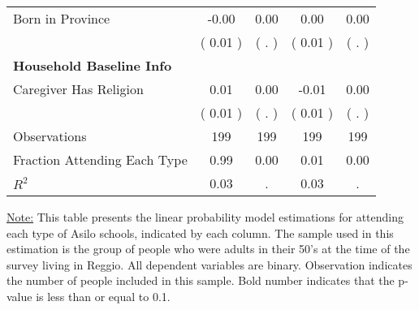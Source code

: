 \begin{table}[H]
{\begin{tabular}{lcccc}
\quad Born in Province &     -0.00 &      0.00 &      0.00 &      0.00 \\
\quad  & (     0.01 ) & (        . )  & (     0.01 )  & (        . )  \\
\midrule
\textbf{Household Baseline Info} \\
\quad Caregiver Has Religion &      0.01 &      0.00 &     -0.01 &      0.00 \\
\quad  & (     0.01 ) & (        . )  & (     0.01 )  & (        . )  \\
\midrule
Observations & 199 & 199 & 199 & 199 \\
Fraction Attending Each Type &      0.99 &      0.00 &      0.01 &      0.00 \\
\midrule
$ R^2$ &      0.03 &         . &      0.03 &         . \\
\bottomrule
\end{tabular}}
\end{table}
\begin{footnotesize}
\noindent\underline{Note:} This table presents the linear probability model estimations for attending each type of Asilo schools, indicated by each column. The sample used in this estimation is the group of people who were adults in their 50's at the time of the survey living in Reggio. All dependent variables are binary. Observation indicates the number of people included in this sample. Bold number indicates that the p-value is less than or equal to 0.1.
\end{footnotesize}

